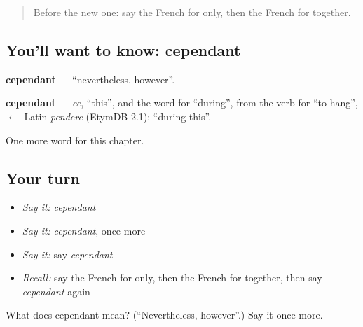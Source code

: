 \label{lesson:FR-C217-cependant}



\begin{quote}
Before the new one: say the French for only, then the French for together.
\end{quote}

\subsection*{You'll want to know: cependant}
\textbf{cependant} — \textquotedblleft{}nevertheless, however\textquotedblright{}.

\begin{cousinweb}
\textbf{cependant} — \emph{ce}, \textquotedblleft{}this\textquotedblright{}, and the word for \textquotedblleft{}during\textquotedblright{}, from the verb for \textquotedblleft{}to hang\textquotedblright{}, $\leftarrow$ Latin \emph{pendere} (EtymDB 2.1): \textquotedblleft{}during this\textquotedblright{}.
\end{cousinweb}

\begin{grammarlens}[title={What you've built}]
One more word for this chapter.
\end{grammarlens}

\subsection*{Your turn}
\begin{itemize}
\raggedright
  \item \emph{Say it:} \emph{cependant}
  \item \emph{Say it:} \emph{cependant}, once more
  \item \emph{Say it:} say \emph{cependant}
  \item \emph{Recall:} say the French for only, then the French for together, then say \emph{cependant} again
\end{itemize}

\begin{tcolorbox}[breakable,colback=teal!4,colframe=teal!35!black,title={Before you move on}]
What does cependant mean? (\textquotedblleft{}Nevertheless, however\textquotedblright{}.) Say it once more.
\end{tcolorbox}
